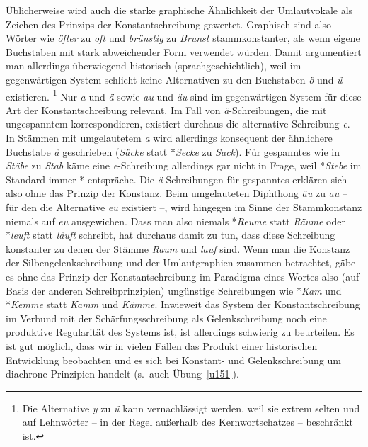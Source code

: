 Üblicherweise wird auch die starke graphische Ähnlichkeit der Umlautvokale als Zeichen des Prinzips der Konstantschreibung gewertet.
Graphisch sind also Wörter wie \textit{öfter} zu \textit{oft} und \textit{brünstig} zu \textit{Brunst} stammkonstanter, als wenn eigene Buchstaben mit stark abweichender Form verwendet würden.
Damit argumentiert man allerdings überwiegend historisch (sprachgeschichtlich), weil im gegenwärtigen System schlicht keine Alternativen zu den Buchstaben \textit{ö} und \textit{ü} existieren.%
\footnote{Die Alternative \textit{y} zu \textit{ü} kann vernachlässigt werden, weil sie extrem selten und auf Lehnwörter -- in der Regel außerhalb des Kernwortschatzes -- beschränkt ist.}
Nur \textit{a} und \textit{ä} sowie \textit{au} und \textit{äu} sind im gegenwärtigen System für diese Art der Konstantschreibung relevant.
Im Fall von \textit{ä}-Schreibungen, die mit ungespanntem \textipa{[E]} korrespondieren, existiert durchaus die alternative Schreibung \textit{e}.
In Stämmen mit umgelautetem \textit{a} wird allerdings konsequent der ähnlichere Buchstabe \textit{ä} geschrieben (\textit{Säcke} statt *\textit{Secke} zu \textit{Sack}).
Für gespanntes \textipa{[E:]} wie in \textit{Stäbe} \textipa{[StE:b@]} zu \textit{Stab} \textipa{[Sta:p]} käme eine \textit{e}-Schreibung allerdings gar nicht in Frage, weil *\textit{Stebe} im Standard immer *\textipa{[Ste:b@]} entspräche.
Die \textit{ä}-Schreibungen für gespanntes \textipa{[E:]} erklären sich also ohne das Prinzip der Konstanz.
Beim umgelauteten Diphthong \textit{äu} \textipa{[\t{O\oe}]} zu \textit{au} -- für den die Alternative \textit{eu} existiert --, wird hingegen im Sinne der Stammkonstanz niemals auf \textit{eu} ausgewichen.
Dass man also niemals *\textit{Reume} statt \textit{Räume} oder *\textit{leuft} statt \textit{läuft} schreibt, hat durchaus damit zu tun, dass diese Schreibung konstanter zu denen der Stämme \textit{Raum} und \textit{lauf} sind.
Wenn man die Konstanz der Silbengelenkschreibung und der Umlautgraphien zusammen betrachtet, gäbe es ohne das Prinzip der Konstantschreibung im Paradigma eines Wortes also (auf Basis der anderen Schreibprinzipien) ungünstige Schreibungen wie *\textit{Kam} und *\textit{Kemme} statt \textit{Kamm} und \textit{Kämme}.
Inwieweit das System der Konstantschreibung im Verbund mit der Schärfungsschreibung als Gelenkschreibung noch eine produktive Regularität des Systems ist, ist allerdings schwierig zu beurteilen.
Es ist gut möglich, dass wir in vielen Fällen das Produkt einer historischen Entwicklung beobachten und es sich bei Konstant- und Gelenkschreibung um diachrone Prinzipien handelt (s.\ auch Übung~\ref{u151}).

